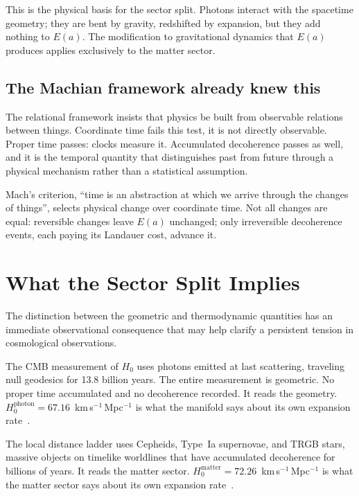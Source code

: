 \documentclass[12pt,a4paper]{article}
\begin{document}
This is the physical basis for the sector split. Photons interact with the
spacetime geometry; they are bent by gravity, redshifted by expansion,
but they add nothing to $E(a)$. The modification to gravitational
dynamics that $E(a)$ produces applies exclusively to the matter sector.

\subsection{The Machian framework already knew this}

The relational framework insists that physics be built from observable
relations between things. Coordinate time fails this test, it is not
directly observable. Proper time passes: clocks measure it. Accumulated
decoherence passes as well, and it is the temporal quantity that distinguishes
past from future through a physical mechanism rather than a statistical
assumption.

Mach's criterion, ``time is an abstraction at which we arrive through the changes
of things'', selects physical change over coordinate time. Not all changes are
equal: reversible changes leave $E(a)$ unchanged; only irreversible decoherence
events, each paying its Landauer cost, advance it.

\section{What the Sector Split Implies}
\label{sec:sectorsplit}

The distinction between the geometric and thermodynamic quantities has an immediate
observational consequence that may help clarify a persistent tension
in cosmological observations.

The CMB measurement of $H_0$ uses photons emitted at last scattering,
traveling null geodesics for 13.8 billion years. The entire measurement is
geometric. No proper time accumulated and no decoherence recorded. It reads the
geometry. $H_0^{\text{photon}} = 67.16$~km\,s$^{-1}$\,Mpc$^{-1}$ is what the
manifold says about its own expansion rate~\citep{PlanckCollaboration2020}.

The local distance ladder uses Cepheids, Type~Ia supernovae, and TRGB
stars, massive objects on timelike worldlines that have accumulated
decoherence for billions of years. It reads the matter sector.
$H_0^{\text{matter}} = 72.26$~km\,s$^{-1}$\,Mpc$^{-1}$ is what the
matter sector says about its own expansion
rate~\citep{Riess2022,mahaffey2026obs}.
\end{document}
